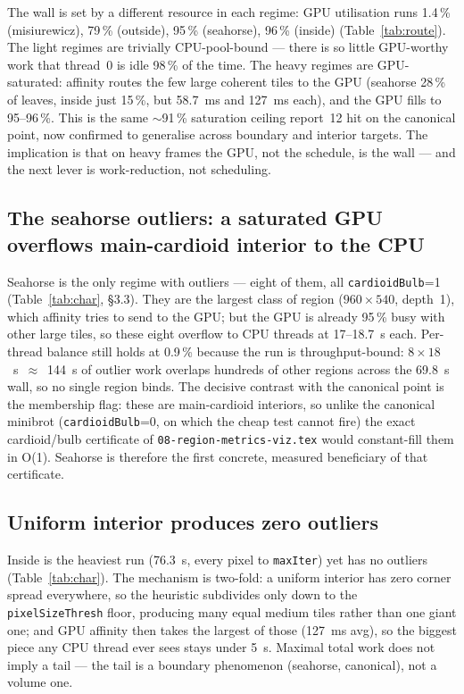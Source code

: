 \documentclass[
	english,
	letterpaper, oneside
]{article}
\begin{document}
The wall is set by a different resource in each regime: GPU utilisation runs
1.4\,\% (misiurewicz), 79\,\% (outside), 95\,\% (seahorse), 96\,\% (inside)
(Table~\ref{tab:route}). The light regimes are trivially CPU-pool-bound --- there
is so little GPU-worthy work that thread~0 is idle 98\,\% of the time. The heavy
regimes are GPU-saturated: affinity routes the few large coherent tiles to the
GPU (seahorse 28\,\% of leaves, inside just 15\,\%, but 58.7~ms and 127~ms each),
and the GPU fills to 95--96\,\%. This is the same $\sim$91\,\% saturation ceiling
report~12 hit on the canonical point, now confirmed to generalise across
boundary and interior targets. The implication is that on heavy frames the GPU,
not the schedule, is the wall --- and the next lever is work-reduction, not
scheduling.

\subsection{The seahorse outliers: a saturated GPU overflows main-cardioid interior to the CPU}

Seahorse is the only regime with outliers --- eight of them, all
\texttt{cardioidBulb}=1 (Table~\ref{tab:char}, §3.3). They are the largest class
of region ($960\times540$, depth~1), which affinity tries to send to the
GPU; but the GPU is already 95\,\% busy with other large tiles, so these eight
overflow to CPU threads at 17--18.7~s each. Per-thread balance still holds at
0.9\,\% because the run is throughput-bound: $8\times18$~s~$\approx$~144~s of
outlier work overlaps hundreds of other regions across the 69.8~s wall, so no
single region binds. The decisive contrast with the canonical point is the
membership flag: these are main-cardioid interiors, so unlike the canonical
minibrot (\texttt{cardioidBulb}=0, on which the cheap test cannot fire) the exact
cardioid/bulb certificate of \texttt{08-region-metrics-viz.tex} would
constant-fill them in O(1). Seahorse is therefore the first concrete,
measured beneficiary of that certificate.

\subsection{Uniform interior produces zero outliers}

Inside is the heaviest run (76.3~s, every pixel to \texttt{maxIter}) yet has
no outliers (Table~\ref{tab:char}). The mechanism is two-fold: a uniform
interior has zero corner spread everywhere, so the heuristic subdivides only down
to the \texttt{pixelSizeThresh} floor, producing many equal medium tiles rather
than one giant one; and GPU affinity then takes the largest of those (127~ms
avg), so the biggest piece any CPU thread ever sees stays under 5~s. Maximal
total work does not imply a tail --- the tail is a boundary phenomenon
(seahorse, canonical), not a volume one.
\end{document}
